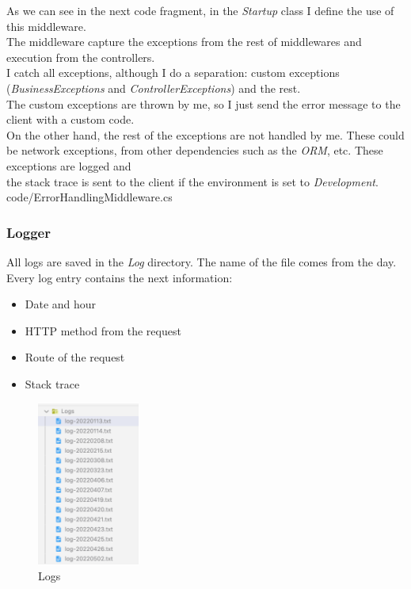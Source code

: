         As we can see in the next code fragment, in the \textit{Startup} class I define the use of this middleware. \\
        The middleware capture the exceptions from the rest of middlewares and execution from the controllers. \\

        I catch all exceptions, although I do a separation: custom exceptions (\textit{BusinessExceptions} and \textit{ControllerExceptions}) and the rest. \\
        The custom exceptions are thrown by me, so I just send the error message to the client with a custom code. \\
        On the other hand, the rest of the exceptions are not handled by me. These could be network exceptions, from other dependencies such as the \textit{ORM}, etc. These exceptions are logged and \\
        the stack trace is sent to the client if the environment is set to \textit{Development}. \\
        
        {code/ErrorHandlingMiddleware.cs}

        \subsubsection{Logger}
            All logs are saved in the \textit{Log} directory. The name of the file comes from the day. Every log entry contains the next information:
            \begin{itemize}[noitemsep]
                \item Date and hour
                \item HTTP method from the request
                \item Route of the request
                \item Stack trace
            \end{itemize}
            \begin{figure}[H]
                \centering
                    \includegraphics[width=0.3\textwidth]{assets/logs.png}
                \caption{Logs}
                \label{fig:implementation_logs}
            \end{figure}
        
